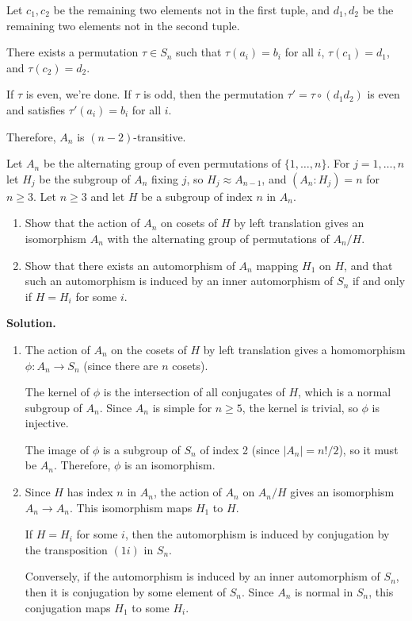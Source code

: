 Let $c_1, c_2$ be the remaining two elements not in the first tuple, and $d_1, d_2$ be the remaining two elements not in the second tuple.

There exists a permutation $\tau \in S_n$ such that $\tau(a_i) = b_i$ for all $i$, $\tau(c_1) = d_1$, and $\tau(c_2) = d_2$.

If $\tau$ is even, we're done. If $\tau$ is odd, then the permutation $\tau' = \tau \circ (d_1 d_2)$ is even and satisfies $\tau'(a_i) = b_i$ for all $i$.

Therefore, $A_n$ is $(n-2)$-transitive.

\begin{problembox}
Let $A_n$ be the alternating group of even permutations of $\{1, \ldots, n\}$. For $j = 1, \ldots, n$ let $H_j$ be the subgroup of $A_n$ fixing $j$, so $H_j \approx A_{n-1}$, and $(A_n : H_j) = n$ for $n \geq 3$. Let $n \geq 3$ and let $H$ be a subgroup of index $n$ in $A_n$.
\begin{enumerate}[label=(\alph*)]
\item Show that the action of $A_n$ on cosets of $H$ by left translation gives an isomorphism $A_n$ with the alternating group of permutations of $A_n/H$.
\item Show that there exists an automorphism of $A_n$ mapping $H_1$ on $H$, and that such an automorphism is induced by an inner automorphism of $S_n$ if and only if $H = H_i$ for some $i$.
\end{enumerate}
\end{problembox}

\noindent\textbf{Solution.}
\begin{enumerate}[label=(\alph*)]
\item The action of $A_n$ on the cosets of $H$ by left translation gives a homomorphism $\phi: A_n \to S_n$ (since there are $n$ cosets).

The kernel of $\phi$ is the intersection of all conjugates of $H$, which is a normal subgroup of $A_n$. Since $A_n$ is simple for $n \geq 5$, the kernel is trivial, so $\phi$ is injective.

The image of $\phi$ is a subgroup of $S_n$ of index 2 (since $|A_n| = n!/2$), so it must be $A_n$. Therefore, $\phi$ is an isomorphism.

\item Since $H$ has index $n$ in $A_n$, the action of $A_n$ on $A_n/H$ gives an isomorphism $A_n \to A_n$. This isomorphism maps $H_1$ to $H$.

If $H = H_i$ for some $i$, then the automorphism is induced by conjugation by the transposition $(1i)$ in $S_n$.

Conversely, if the automorphism is induced by an inner automorphism of $S_n$, then it is conjugation by some element of $S_n$. Since $A_n$ is normal in $S_n$, this conjugation maps $H_1$ to some $H_i$.
\end{enumerate}

